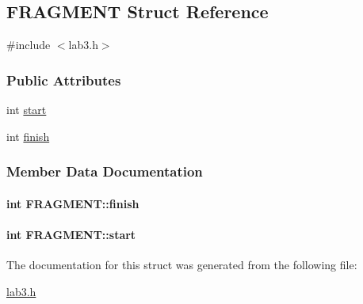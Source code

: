\hypertarget{structFRAGMENT}{\subsection{F\+R\+A\+G\+M\+E\+N\+T Struct Reference}
\label{structFRAGMENT}
}


{\ttfamily \#include $<$lab3.\+h$>$}

\subsubsection*{Public Attributes}
\begin{DoxyCompactItemize}
\item 
int \hyperlink{structFRAGMENT_a9a2c77dc5f1c259a9a063f8e6ae18724}{start}
\item 
int \hyperlink{structFRAGMENT_a3edee1f345e206cdc220b16d7d290018}{finish}
\end{DoxyCompactItemize}


\subsubsection{Member Data Documentation}
\hypertarget{structFRAGMENT_a3edee1f345e206cdc220b16d7d290018}{
\paragraph[{finish}]{\setlength{\rightskip}{0pt plus 5cm}int F\+R\+A\+G\+M\+E\+N\+T\+::finish}}\label{structFRAGMENT_a3edee1f345e206cdc220b16d7d290018}
\hypertarget{structFRAGMENT_a9a2c77dc5f1c259a9a063f8e6ae18724}{
\paragraph[{start}]{\setlength{\rightskip}{0pt plus 5cm}int F\+R\+A\+G\+M\+E\+N\+T\+::start}}\label{structFRAGMENT_a9a2c77dc5f1c259a9a063f8e6ae18724}


The documentation for this struct was generated from the following file\+:\begin{DoxyCompactItemize}
\item 
\hyperlink{lab3_8h}{lab3.\+h}\end{DoxyCompactItemize}
